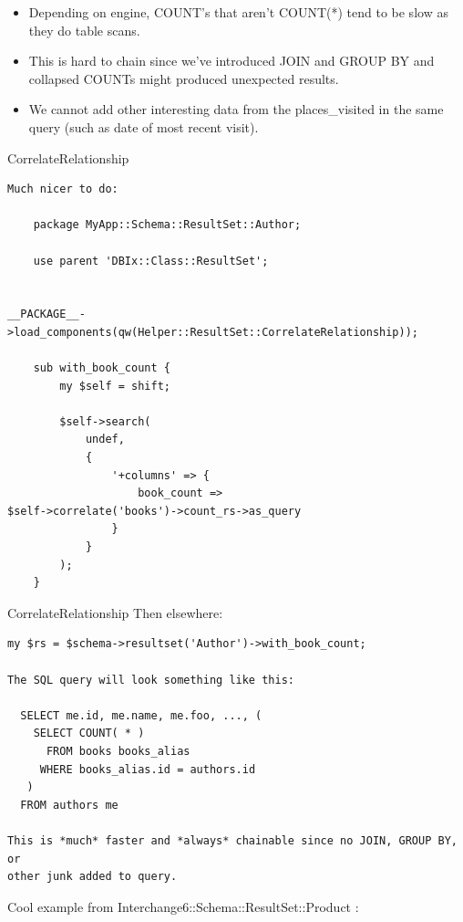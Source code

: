 \begin{itemize}
\item Depending on engine, COUNT’s that aren’t COUNT(*) tend to be slow as
they do table scans.
\item This is hard to chain since we've introduced JOIN and GROUP BY and
collapsed COUNTs might produced unexpected results.
\item We cannot add other interesting data from the places\_visited in the same query (such as date of most recent visit).
\end{itemize}

\begin{frame}[fragile]{CorrelateRelationship}
\begin{lstlisting}
Much nicer to do:

    package MyApp::Schema::ResultSet::Author;

    use parent 'DBIx::Class::ResultSet';

   
__PACKAGE__->load_components(qw(Helper::ResultSet::CorrelateRelationship));

    sub with_book_count {
        my $self = shift;

        $self->search(
            undef,
            {
                '+columns' => {
                    book_count =>
$self->correlate('books')->count_rs->as_query
                }
            }
        );
    }
\end{lstlisting}
\end{frame}

\begin{frame}[fragile]{CorrelateRelationship}
Then elsewhere:

\begin{lstlisting}
my $rs = $schema->resultset('Author')->with_book_count;

The SQL query will look something like this:

  SELECT me.id, me.name, me.foo, ..., (
    SELECT COUNT( * )
      FROM books books_alias
     WHERE books_alias.id = authors.id
   )
  FROM authors me

This is *much* faster and *always* chainable since no JOIN, GROUP BY, or
other junk added to query.
\end{lstlisting}
\end{frame}

Cool example from Interchange6::Schema::ResultSet::Product :

